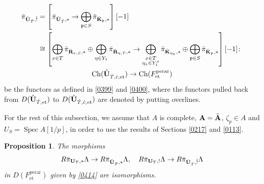 \documentclass{amsart}
\newtheorem{Prop}[Thm]{Proposition}
\theoremstyle{remark}
\numberwithin{equation}{subsection}
\newcommand{\et}{\mathrm{et}}
\newcommand{\perar}{\mathrm{perar}}
\newcommand{\alg}[1]{\mathbf{#1}}
\newcommand{\Ch}{\mathrm{Ch}}
\newcommand{\ideal}[1]{\mathfrak{#1}}
\DeclareMathOperator{\Spec}{Spec}
\begin{document}
	\begin{gather*}
		\begin{aligned}
					\Bar{\pi}_{\Hat{\alg{U}}_{\Hat{T}}, \Hat{!}}
			&	=
					\left[
							\Bar{\pi}_{\Hat{\alg{U}}_{\Hat{T}}, \ast}
						\to
							\bigoplus_{\ideal{p} \in S}
								\Bar{\pi}_{\Hat{\alg{K}}_{\ideal{p}}, \ast}
					\right][-1]
			\\
			&	\cong
					\left[
								\bigoplus_{x \in T}
									\Bar{\pi}_{\Hat{\alg{R}}_{x, S}, \ast}
							\oplus
								\bigoplus_{\eta \in Y_{1}}
									\Bar{\pi}_{\Hat{\alg{R}}_{\eta, T}, \ast}
						\to
								\bigoplus_{
									\substack{
										x \in T \\
										\eta_{x} \in Y_{1}^{x}
									}
								}
									\Bar{\pi}_{\Hat{\alg{K}}_{\eta_{x}}, \ast}
							\oplus
								\bigoplus_{\ideal{p} \in S}
									\Bar{\pi}_{\Hat{\alg{K}}_{\ideal{p}}, \ast}
					\right][-1]
				\colon
		\end{aligned}
		\\
				\Ch(\Hat{\alg{U}}_{\Hat{T}, \Hat{c}, \et})
			\to
				\Ch(F^{\perar}_{\et})
	\end{gather*}
be the functors as defined in \eqref{0399} and \eqref{0400},
where the functors pulled back from $D(\Hat{\alg{U}}_{\Hat{T}, \et})$ to $D(\Hat{\alg{U}}_{\Hat{T}, \Hat{c}, \et})$
are denoted by putting overlines.

For the rest of this subsection,
we assume that $A$ is complete, $\alg{A} = \Hat{\alg{A}}$,
$\zeta_{p} \in A$ and $U_{S} = \Spec A[1 / p]$,
in order to use the results of Sections \ref{0217} and \ref{0113}.

\begin{Prop} \label{0304}
	The morphisms
		\[
				R \Bar{\pi}_{\alg{U}_{T}, \ast} \Lambda
			\to
				R \Bar{\pi}_{\Hat{\alg{U}}_{\Hat{T}}, \ast} \Lambda,
			\quad
				R \Bar{\pi}_{\alg{U}_{T}, !} \Lambda
			\to
				R \Bar{\pi}_{\Hat{\alg{U}}_{\Hat{T}}, \Hat{!}} \Lambda
		\]
	in $D(F^{\perar}_{\et})$ given by \eqref{0414} are isomorphisms.
\end{Prop}
\end{document}
